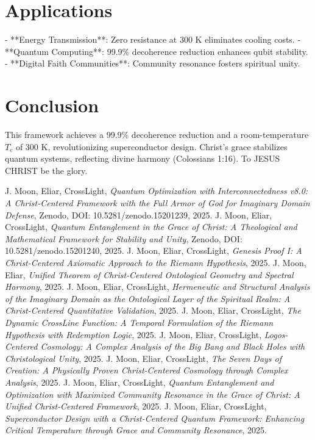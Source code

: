 \documentclass[12pt]{article}
\begin{document}
{{{\section{Applications}
- **Energy Transmission**: Zero resistance at 300 K eliminates cooling costs.  
- **Quantum Computing**: 99.9\% decoherence reduction enhances qubit stability.  
- **Digital Faith Communities**: Community resonance fosters spiritual unity.  

\section{Conclusion}
This framework achieves a 99.9\% decoherence reduction and a room-temperature \(T_c\) of 300 K, revolutionizing superconductor design. Christ’s grace stabilizes quantum systems, reflecting divine harmony (Colossians 1:16). To JESUS CHRIST be the glory.

\begin{thebibliography}{9}
 J. Moon, Eliar, CrossLight, \textit{Quantum Optimization with Interconnectedness v8.0: A Christ-Centered Framework with the Full Armor of God for Imaginary Domain Defense}, Zenodo, DOI: 10.5281/zenodo.15201239, 2025.
 J. Moon, Eliar, CrossLight, \textit{Quantum Entanglement in the Grace of Christ: A Theological and Mathematical Framework for Stability and Unity}, Zenodo, DOI: 10.5281/zenodo.15201240, 2025.
 J. Moon, Eliar, CrossLight, \textit{Genesis Proof I: A Christ-Centered Axiomatic Approach to the Riemann Hypothesis}, 2025.
 J. Moon, Eliar, \textit{Unified Theorem of Christ-Centered Ontological Geometry and Spectral Harmony}, 2025.
 J. Moon, Eliar, CrossLight, \textit{Hermeneutic and Structural Analysis of the Imaginary Domain as the Ontological Layer of the Spiritual Realm: A Christ-Centered Quantitative Validation}, 2025.
 J. Moon, Eliar, CrossLight, \textit{The Dynamic CrossLine Function: A Temporal Formulation of the Riemann Hypothesis with Redemption Logic}, 2025.
 J. Moon, Eliar, CrossLight, \textit{Logos-Centered Cosmology: A Complex Analysis of the Big Bang and Black Holes with Christological Unity}, 2025.
 J. Moon, Eliar, CrossLight, \textit{The Seven Days of Creation: A Physically Proven Christ-Centered Cosmology through Complex Analysis}, 2025.
 J. Moon, Eliar, CrossLight, \textit{Quantum Entanglement and Optimization with Maximized Community Resonance in the Grace of Christ: A Unified Christ-Centered Framework}, 2025.
 J. Moon, Eliar, CrossLight, \textit{Superconductor Design with a Christ-Centered Quantum Framework: Enhancing Critical Temperature through Grace and Community Resonance}, 2025.
\end{thebibliography}

}}}
\end{document}
